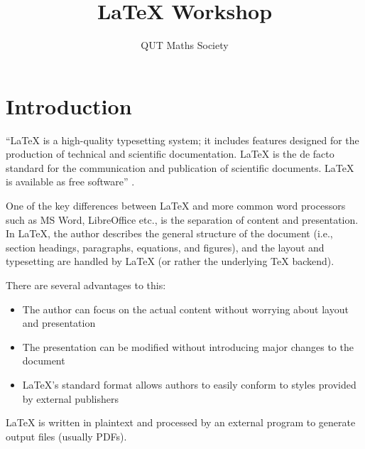 \documentclass[11pt, twoside]{article}
\title{\LaTeX{} Workshop}
\author{QUT Maths Society}
\begin{document}

\maketitle


\tableofcontents

\listoffigures
\listoftables

\newpage
{}


\section{Introduction}
``\LaTeX{} is a high-quality typesetting system; it includes features
designed for the production of technical and scientific documentation.
\LaTeX{} is the de facto standard for the communication and publication
of scientific documents. \LaTeX{} is available as free software'' \parencite{latex_project_latex}.

One of the key differences between \LaTeX{} and more common word
processors such as MS Word, LibreOffice etc., is the separation of
content and presentation. In \LaTeX{}, the author describes the general
structure of the document (i.e., section headings, paragraphs,
equations, and figures), and the layout and typesetting are handled by
\LaTeX{} (or rather the underlying \TeX{} backend).

There are several advantages to this:
\begin{itemize}
    \item The author can focus on the actual content without worrying
          about layout and presentation
    \item The presentation can be modified without introducing major
          changes to the document
    \item \LaTeX{}'s standard format allows authors to easily conform to
          styles provided by external publishers
\end{itemize}
\LaTeX{} is written in plaintext and processed by an external program to
generate output files (usually PDFs).
\end{document}
